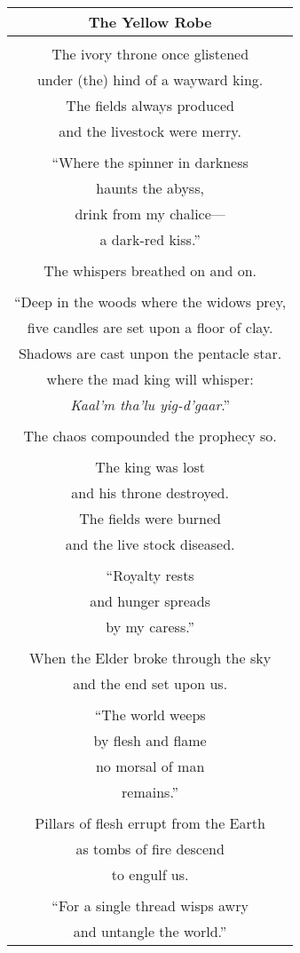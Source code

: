 \documentclass{article}
\begin{document}
\begin{center}
\begin{tabular}{c}
\textbf{The Yellow Robe} \\ \hline
\\
The ivory throne once glistened \\
under (the) hind of a wayward king. \\
The fields always produced \\
and the livestock were merry. \\
\\
``Where the spinner in darkness \\
haunts the abyss, \\
drink from my chalice--- \\
a dark-red kiss.'' \\
\\
The whispers breathed on and on. \\
\\
``Deep in the woods where the widows prey, \\
five candles are set upon a floor of clay. \\
Shadows are cast unpon the pentacle star. \\
where the mad king will whisper: \\
\textit{Kaal'm tha'lu yig-d'gaar}.'' \\
\\
The chaos compounded the prophecy so. \\
\\
The king was lost \\
and his throne destroyed. \\
The fields were burned \\
and the live stock diseased. \\
\\
``Royalty rests \\
and hunger spreads \\
by my caress.'' \\
\\
When the Elder broke through the sky \\
and the end set upon us. \\
\\
``The world weeps \\
by flesh and flame \\
no morsal of man \\
remains.'' \\
\\
Pillars of flesh errupt from the Earth \\
as tombs of fire descend \\
to engulf us. \\
\\
``For a single thread wisps awry \\
and untangle the world.'' \\
\end{tabular}
\end{center}
\end{document}

